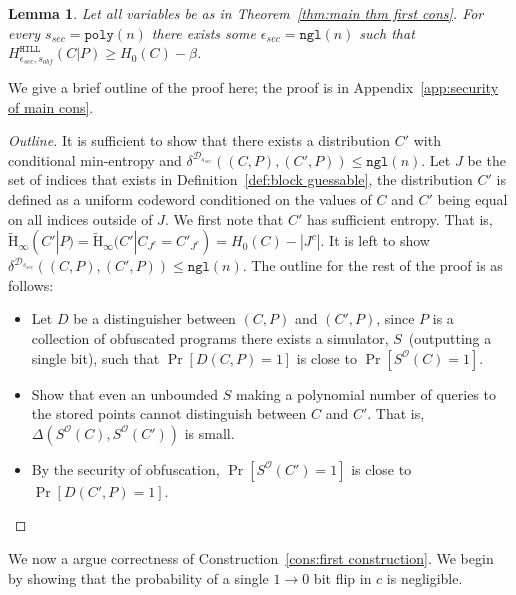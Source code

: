 \documentclass[11pt]{article}
\newcommand{\apref}[1]{\mbox{Appendix~\ref{#1}}}
\newcommand{\thref}[1]{\mbox{Theorem~\ref{#1}}}
\newcommand{\defref}[1]{\mbox{Definition~\ref{#1}}}
\newcommand{\consref}[1]{\mbox{Construction~\ref{#1}}}
\newcommand{\dis}{\ensuremath{\mathsf{dis}}}
\newcommand{\hill}{\ensuremath{\mathtt{HILL}}\xspace}
\newcommand{\poly}{\ensuremath{\mathtt{poly}}\xspace}
\newcommand{\ngl}{\ensuremath{\mathtt{ngl}}\xspace}
\newcommand{\Hav}{\tilde{\mathrm{H}}_\infty}
\newtheorem{lemma}[theorem]{Lemma}
\begin{document}
\begin{lemma}
\label{lem:security of cons}
Let all variables be as in \thref{thm:main thm first cons}.  For every $s_{sec} = \poly(n)$ there exists some $\epsilon_{sec} = \ngl(n)$ such that $H^{\hill}_{\epsilon_{sec}, s_{obf}}( C | P ) \geq H_0(C) - \beta$.%
\end{lemma}

We give a brief outline of the proof here; the proof is in \apref{app:security of main cons}.
\begin{proof}[Outline]
It is sufficient to show that there exists a distribution $C'$ with conditional min-entropy and $\delta^{\mathcal{D}_{s_{sec}}}((C, P), (C', P))\le \ngl(n)$.  Let $J$ be the set of indices that exists in \defref{def:block guessable}, the distribution $C'$ is defined as a uniform codeword conditioned on the values of $C$ and $C'$ being equal on all indices outside of $J$.  We first note that $C'$ has sufficient entropy.  That is, $\Hav(C' |P) =\Hav(C' | C_{J^c} = C'_{J^c}) = H_0(C) - |J^c|$.  It is left to show $\delta^{\mathcal{D}_{s_{sec}}}((C, P), (C', P)) \le \ngl(n)$.
The outline for the rest of the proof is as follows:
\begin{itemize}
\item Let $D$ be a distinguisher between $(C, P)$ and $(C', P)$, since $P$ is a collection of obfuscated programs there exists a simulator, $S$~(outputting a single bit), such that $\Pr[D(C, P)=1]$ is close to $\Pr[S^{\mathcal{O}}(C)=1]$.
\item Show that even an unbounded $S$ making a polynomial number of queries to the stored points cannot distinguish between $C$ and $C'$.  That is, $\Delta(S^{\mathcal{O}}(C),S^{\mathcal{O}}(C'))$ is small.
\item By the security of obfuscation, $\Pr[S^{\mathcal{O}}(C')=1]$ is close to $\Pr[D(C', P)=1]$.
\end{itemize}
\end{proof}
We now a argue correctness of \consref{cons:first construction}.
We begin by showing that the probability of a single $1\rightarrow 0$ bit flip in $c$ is negligible.
\end{document}
